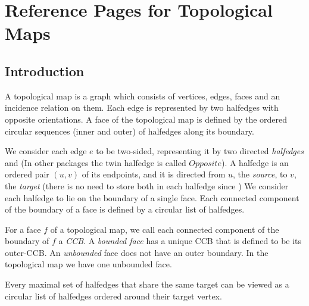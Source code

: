 
\clearpage
\section{Reference Pages for Topological Maps}


\subsection*{Introduction}

A topological map is a graph which consists of vertices,
edges, faces and an incidence relation on them.
Each edge is represented by two halfedges with opposite orientations.
A face of the topological map is defined by the ordered
circular sequences 
(inner and outer) of halfedges along its boundary.

We consider each edge $e$ to be two-sided, representing it by two
directed {\em halfedges}  and 
(In other packages the twin halfedge is called $Opposite$).  
A halfedge  is an ordered pair $(u,v)$ of its endpoints, and
it is directed from $u$, the {\em source}, to $v$, the {\em target} (there 
is no need to store both in each halfedge since 
%
)
We consider each halfedge to lie on the boundary of a single face.
Each connected component of the boundary of a face is %
defined by a
circular list of halfedges. 

For a face $f$ of a topological map, 
we call each
connected component of the boundary of $f$ a {\em CCB}.
A {\em bounded face} has a
unique CCB that is defined to be
its outer-CCB. An
{\em unbounded} face does not have an outer boundary.
In the topological map we have one unbounded face.

Every maximal set of halfedges that share the same target can be viewed 
as a circular list of halfedges ordered %
around their target vertex.


